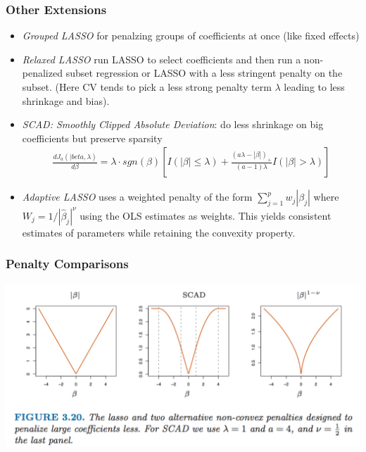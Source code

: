 \begin{frame}
    \frametitle{Other Extensions}
    \begin{itemize}
    \item \textit{Grouped LASSO} for penalzing groups of coefficients at once (like fixed effects)
    \item \textit{Relaxed LASSO} run LASSO to select coefficients and then run a non-penalized subset regression or LASSO with a less stringent penalty on the subset. (Here CV tends to pick a less strong penalty term $\lambda$ leading to less shrinkage and bias).
    \item \textit{SCAD: Smoothly Clipped Absolute Deviation}: do less shrinkage on big coefficients but preserve sparsity
    \begin{eqnarray*}
    \frac{ d J_a(|beta,\lambda)}{d \beta} = \lambda \cdot sgn(\beta) \left[ I(| \beta| \leq \lambda) + \frac{(a \lambda - | \beta|)_{+}}{(a-1) \lambda} I (| \beta| > \lambda) \right]
    \end{eqnarray*}
    \item \textit{Adaptive LASSO} uses  a weighted penalty of the form $\sum_{j=1}^p w_j |\beta_j|$ where $W_j = 1/|\hat{\beta}_j|^{\nu}$ using the OLS estimates as weights. This yields consistent estimates of parameters while retaining the convexity property.
    \end{itemize}
\end{frame}

\begin{frame}
    \frametitle{Penalty Comparisons}
    \begin{center}
    \includegraphics[width=\textwidth]{./resources/lassopenalty}
    \end{center}
\end{frame}
    

